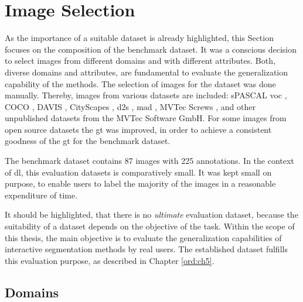 
\section{Image Selection}\label{ord:ch4:sec4}

As the importance of a suitable dataset is already highlighted, this Section focuses on the composition of the benchmark dataset.
It was a conscious decision to select images from different domains and with different attributes.
Both, diverse domains and attributes, are fundamental to evaluate the generalization capability of the methods.
The selection of images for the dataset was done manually.
Thereby, images from various datasets are included: sPASCAL \gls{voc} \cite{Eve20-PascalVOC}, COCO \cite{Lin14-Coco}, DAVIS \cite{Per16-DAVIS}, CityScapes \cite{Cor16-Cityscapes}, \gls{d2s} \cite{Paddo18-D2S}, \gls{mad} \cite{Bergmann19-MAD}, MVTec Screws \cite{UFN19-Screws}, and other unpublished datasets from the MVTec Software GmbH.
For some images from open source datasets the \gls{gt} was improved, in order to achieve a consistent goodness of the \gls{gt} for the benchmark dataset.

The benchmark dataset contains 87 images with 225 annotations.
In the context of \gls{dl}, this evaluation datasets is comparatively small.
It was kept small on purpose, to enable users to label the majority of the images in a reasonable expenditure of time.
 
It should be highlighted, that there is no \textit{ultimate} evaluation dataset, because the suitability of a dataset depends on the objective of the task.
Within the scope of this thesis, the main objective is to evaluate the generalization capabilities of interactive segmentation methods by real users.
The established dataset fulfills this evaluation purpose, as described in Chapter \ref{ord:ch5}.


\subsection{Domains}\label{ord:ch4:sec2:subsec1}

